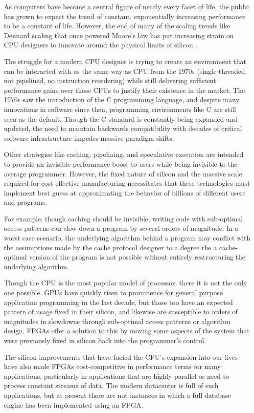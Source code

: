
As computers have become a central figure of nearly every facet of life, the
public has grown to expect the trend of constant, exponentially increasing
performance to be a constant of life. However, the end of many of the scaling
trends like Dennard scaling that once powered Moore's law has put increasing
strain on CPU designers to innovate around the physical limits of silicon
\autocite{dark-silicon}.

The struggle for a modern CPU designer is trying to create an environment that
can be interacted with as the same way as CPU from the 1970s (single threaded,
not pipelined, no instruction reordering) while still delivering sufficient
performance gains over those CPUs to justify their existence in the market. The
1970s saw the introduction of the C programming language, and despite many
innovations in software since then, programming environments like C are still
seen as the default. Though the C standard is constantly being expanded and
updated, the need to maintain backwards compatibility with decades of critical
software infrastructure impedes massive paradigm shifts.

Other strategies like caching, pipelining, and speculative execution are
intended to provide an invisible performance boost to users while being
invisible to the average programmer. However, the fixed nature of silicon and
the massive scale required for cost-effective manufacturing necessitates that
these technologies must implement best guess at approximating the behavior of
billions of different users and programs.

For example, though caching should be invisible, writing code with sub-optimal
access patterns can slow down a program by several orders of magnitude. In a
worst case scenario, the underlying algorithm behind a program may conflict with
the assumptions made by the cache protocol designer to a degree the a
cache-optimal version of the program is not possible without entirely
restructuring the underlying algorithm.

Though the CPU is the most popular model of processor, there it is not the only
one possible. GPUs have quickly risen to prominence for general purpose
application programming in the last decade, but those too have an expected
pattern of usage fixed in their silicon, and likewise are susceptible to orders
of magnitudes in slowdowns through sub-optimal access patterns or algorithm
design. FPGAs offer a solution to this by moving some aspects of the system that
were previously fixed in silicon back into the programmer's control.

The silicon improvements that have fueled the CPU's expansion into our lives
have also made FPGAs cost-competitive in performance terms for many
applications, particularly in applications that are highly parallel or need to
process constant streams of data. The modern datacenter is full of such
applications, but at present there are not instances in which a full database
engine has been implemented using an FPGA.
